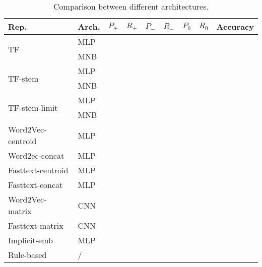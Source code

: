 \documentclass[11pt, a4paper]{article}
\begin{document}
\begin{table}[hpt]
	\centering
	\begin{tabular}{lllllllll}
		\hline\hline
		Rep. & Arch. & $ P_+ $ & $ R_+ $ & $ P_- $ & $ R_- $ & $ P_0 $ & $ R_0 $ & Accuracy \\
		\hline
		
		\multirow{2}{*}{TF} & MLP &  &  &  &  &  &  &  \\
		 & MNB &  &  &  &  &  &  &  \\
		
		\multirow{2}{*}{TF-stem} & MLP &  &  &  &  &  &  &  \\
		 & MNB &  &  &  &  &  &  &  \\
		
		\multirow{2}{*}{TF-stem-limit} & MLP &  &  &  &  &  &  &  \\
		 & MNB &  &  &  &  &  &  &  \\
		
		Word2Vec-centroid & MLP  &  &  &  &  &  &  &  \\
		Word2ec-concat & MLP  &  &  &  &  &  &  &  \\
		Fasttext-centroid & MLP  &  &  &  &  &  &  &  \\
		Fasttext-concat & MLP  &  &  &  &  &  &  &  \\
		Word2Vec-matrix & CNN  &  &  &  &  &  &  &  \\
		Fasttext-matrix & CNN  &  &  &  &  &  &  &  \\
		Implicit-emb & MLP  &  &  &  &  &  &  &  \\
		Rule-based & /  &  &  &  &  &  &  &  \\
		\hline\hline
	\end{tabular}
	\caption{Comparison between different architectures.}
	\label{tab:comp}
\end{table}
\end{document}
